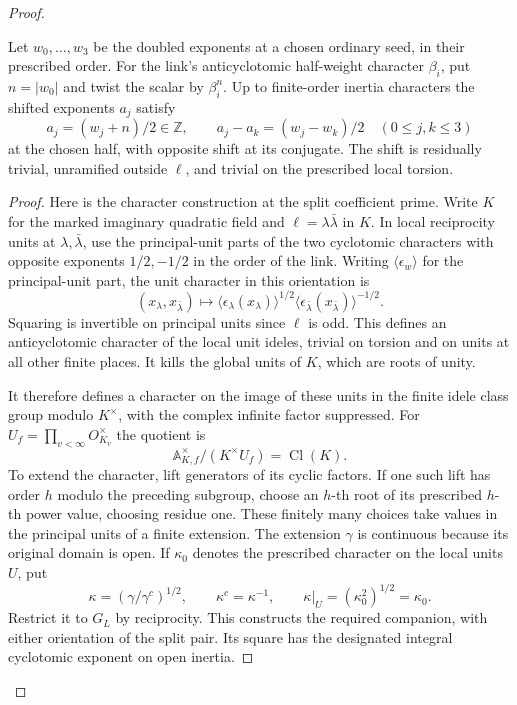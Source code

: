 \begin{proof}

\begin{established}\label{hyp:ordinary-seed-shift}
Let \(w_0,\ldots,w_3\) be the doubled exponents at a chosen
ordinary seed, in their prescribed order. For the link's
anticyclotomic half-weight character \(\beta_i\), put \(n=|w_0|\)
and twist the scalar by \(\beta_i^n\). Up to finite-order inertia
characters the shifted exponents \(a_j\) satisfy
\[
        a_j=(w_j+n)/2\in\mathbb Z,\qquad
        a_j-a_k=(w_j-w_k)/2 \quad (0\le j,k\le3)
\]
at the chosen half, with opposite shift at its conjugate. The shift is
residually trivial, unramified outside \(\ell\), and trivial
on the prescribed local torsion.
\end{established}
\begin{proof}
Here is the character construction at the split coefficient prime.
Write \(K\) for the marked imaginary quadratic field and
\(\ell=\lambda\bar\lambda\) in \(K\). In local reciprocity units
at \(\lambda,\bar\lambda\), use the principal-unit parts of the
two cyclotomic characters with opposite exponents \(1/2,-1/2\)
in the order of the link. Writing \(\langle\epsilon_w\rangle\) for the principal-unit part, the
unit character in this orientation is
\[
 (x_\lambda,x_{\bar\lambda})\longmapsto
  \langle\epsilon_\lambda(x_\lambda)\rangle^{1/2}
  \langle\epsilon_{\bar\lambda}(x_{\bar\lambda})\rangle^{-1/2}.
\]
Squaring is invertible on principal units since \(\ell\) is odd. This defines an anticyclotomic
character of the local unit ideles, trivial on torsion and on
units at all other finite places. It kills the global units of
\(K\), which are roots of unity.

It therefore defines a character on the image of these units
in the finite idele class group modulo \(K^\times\), with the
complex infinite factor suppressed. For \(U_f=\prod_{v<\infty}O_{K_v}^\times\) the quotient is
\[
      \mathbb A_{K,f}^\times/(K^\times U_f)=\operatorname{Cl}(K).
\] To extend the character, lift generators
of its cyclic factors. If one such lift has order \(h\) modulo
the preceding subgroup, choose an \(h\)-th root of its prescribed
\(h\)-th power value, choosing residue one. These finitely many
choices take values in the principal units of a finite extension.
The extension \(\gamma\) is continuous because its original
domain is open. If \(\kappa_0\) denotes the prescribed character on
the local units \(U\), put
\[
 \kappa=(\gamma/\gamma^c)^{1/2},\qquad
 \kappa^c=\kappa^{-1},\qquad
 \kappa|_U=(\kappa_0^2)^{1/2}=\kappa_0 .
\] Restrict it to \(G_L\) by reciprocity.
This constructs the required companion, with either orientation
of the split pair. Its square has the designated integral
cyclotomic exponent on open inertia.


\end{proof}
\end{proof}
